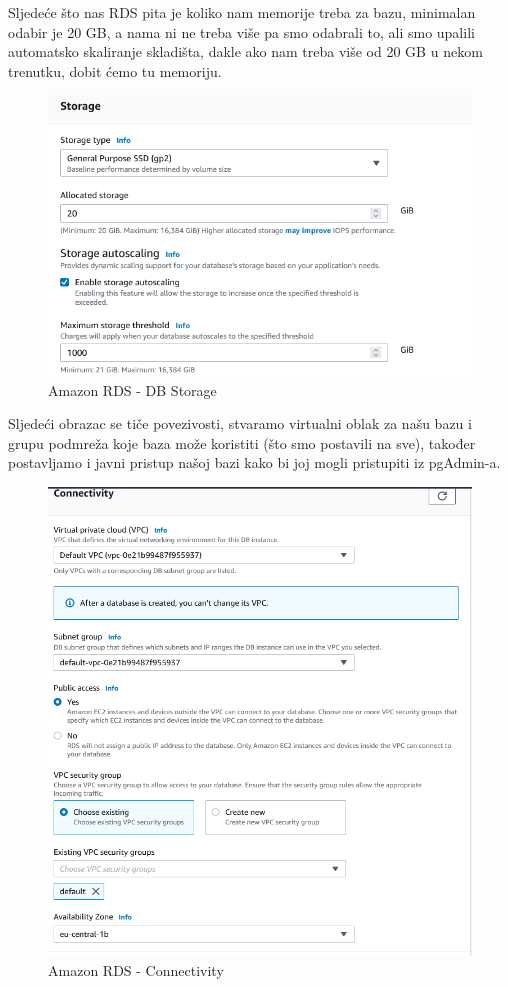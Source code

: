Sljedeće što nas RDS pita je koliko nam memorije treba za bazu, minimalan odabir je 20 GB, a nama ni ne treba više pa smo odabrali to, ali smo upalili\\ automatsko skaliranje skladišta, dakle ako nam treba više od 20 GB u nekom\\ trenutku, dobit ćemo tu memoriju.
	 \begin{figure}[H]
	\centering
	\includegraphics[scale=0.55]{./slike/rds3.png}
	\caption{Amazon RDS - DB Storage}
	\label{fig:rds3}
\end{figure}\eject

Sljedeći obrazac se tiče povezivosti, stvaramo virtualni oblak za našu bazu i grupu podmreža koje baza može koristiti (što smo postavili na sve), također\\ postavljamo i javni pristup našoj bazi kako bi joj mogli pristupiti iz pgAdmin-a.
	 \begin{figure}[H]
	\centering
	\includegraphics[scale=0.55]{./slike/rds4.png}
	\caption{Amazon RDS - Connectivity}
	\label{fig:rds4}
\end{figure}\eject

